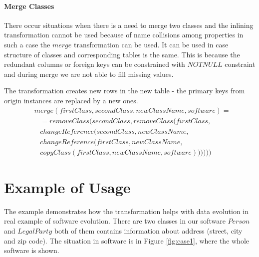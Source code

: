 \documentclass[runningheads]{comsis}
\begin{document}
\paragraph{Merge Classes}
There occur situations when there is a need to merge two classes and the inlining transformation cannot be used because of name collisions among properties in such a case the $merge$ transformation can be used. It can be used in case structure of classes and corresponding tables is the same. This is because the redundant columns or foreign keys can be constrained with $NOTNULL$ constraint and during merge we are not able to fill missing values.

The transformation creates new rows in the new table - the primary keys from origin instances are replaced by a new ones.
\begin{align}
& merge(firstClass, secondClass, newClassName, software) = \nonumber \\
& \; \; \; = removeClass(secondClass, removeClass(firstClass,\nonumber  \\
& \; \; \; changeReference(secondClass, newClassName, \nonumber \\
& \; \; \; changeReference(firstClass, newClassName,\nonumber  \\
& \; \; \; copyClass(firstClass, newClassName, software))))))
\end{align}

\section{Example of Usage}
The example demonstrates how the transformation helps with data evolution in real example of software evolution. There are two classes in our software $Person$ and $LegalParty$ both of them contains information about address (street, city and zip code). The situation in software is in Figure \ref{fig:case1}, where the whole software is shown. 
\end{document}
